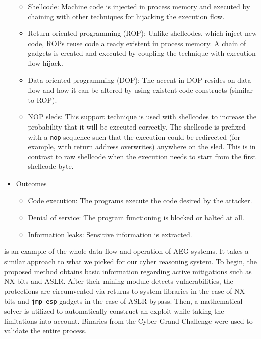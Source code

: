 \documentclass[../main.tex]{subfiles}
\begin{document}
\begin{itemize}
        \begin{itemize}
          \tightlist
          \item
                Shellcode: Machine code is injected in process memory and executed
                by chaining with other techniques for hijacking the execution flow.
          \item
                Return-oriented programming (ROP): Unlike shellcodes, which inject new
                code, ROPs reuse code already existent in process memory. A chain of
                gadgets is created and executed by coupling the technique with
                execution flow hijack.
          \item
                Data-oriented programming (DOP): The accent in DOP resides on data flow
                and how it can be altered by using existent code constructs (similar
                to ROP).
          \item
                NOP sleds: This support technique is used with shellcodes to
                increase the probability that it will be executed correctly. The
                shellcode is prefixed with a \texttt{nop} sequence such that the
                execution could be redirected (for example, with return address
                overwrites) anywhere on the sled. This is in contrast to raw
                shellcode when the execution needs to start from the first shellcode
                byte.
        \end{itemize}
  \item
        Outcomes

        \begin{itemize}
          \tightlist
          \item
                Code execution: The programs execute the code desired by the
                attacker.
          \item
                Denial of service: The program functioning is blocked or halted at
                all.
          \item
                Information leaks: Sensitive information is extracted.
        \end{itemize}
\end{itemize}

\cite{bof_aeg} is an example of the whole data flow and operation of AEG
systems. It takes a similar approach to what we picked for our cyber
reasoning system. To begin, the proposed method obtains basic
information regarding active mitigations such as NX bits and ASLR. After
their mining module detects vulnerabilities, the protections are
circumvented via returns to system libraries in the case of NX bits and
\texttt{jmp\ esp} gadgets in the case of ASLR bypass. Then, a mathematical
solver is utilized to automatically construct an exploit while taking
the limitations into account. Binaries from the Cyber Grand Challenge
were used to validate the entire process.
\end{document}
